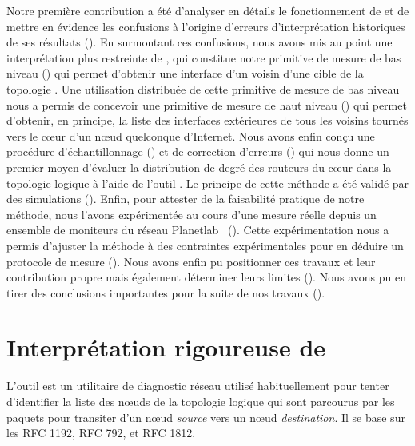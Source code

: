 Notre première contribution a été d'analyser en détails le fonctionnement de
\traceroute et de mettre en évidence les confusions à l'origine d'erreurs
d'interprétation historiques de ses résultats (). En
surmontant ces confusions, nous avons mis au point une interprétation plus
restreinte de \traceroute, qui constitue notre primitive de mesure de bas niveau
() qui permet d'obtenir une interface d'un voisin
d'une cible de la topologie \LLL.
Une utilisation distribuée de cette primitive de mesure de bas niveau nous a
permis de concevoir une primitive de mesure de haut niveau
() qui permet d'obtenir, en principe, la liste
des interfaces extérieures de tous les voisins tournés vers le cœur d'un n\oe{}ud
quelconque d'Internet. Nous avons enfin conçu une procédure d'échantillonnage
() et de correction d'erreurs
() qui nous donne un premier moyen d'évaluer la
distribution de degré des routeurs du cœur dans la topologie logique à l'aide de
l'outil \traceroute. Le principe de cette méthode a été validé par des
simulations (). Enfin, pour attester de la faisabilité
pratique de notre méthode, nous l'avons expérimentée au cours d'une mesure
réelle depuis un ensemble de moniteurs du réseau Planetlab~\cite{planetlab}
(). Cette expérimentation nous a permis d'ajuster
la méthode à des contraintes expérimentales pour en déduire un protocole de
mesure (). Nous avons enfin pu positionner ces
travaux et leur contribution propre mais également déterminer leurs limites
().
Nous avons pu en tirer des conclusions importantes pour la suite de nos travaux
().

\section{Interprétation rigoureuse de \traceroute}
\label{sec:traceroute-rigor}

L'outil \traceroute est un utilitaire de diagnostic réseau utilisé
habituellement pour tenter d'identifier la liste des n\oe{}uds de la topologie
logique qui sont parcourus par les paquets \ip pour transiter d'un n\oe{}ud {\em
source} vers un n\oe{}ud {\em destination}. Il se base sur les RFC 1192,
RFC 792, et RFC 1812.


